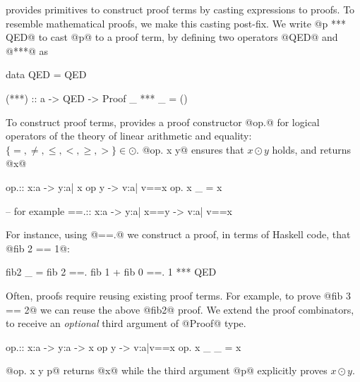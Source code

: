 \libname provides primitives to construct proof terms
by casting expressions to proofs.
%
To resemble mathematical proofs,
we make this casting post-fix.
%
We write @p *** QED@ to cast @p@ to a proof term,
by defining two operators @QED@ and @***@ as
%
\begin{code}
  data QED = QED

  (***) :: a -> QED -> Proof
  _ *** _  = ()
\end{code}

%
To construct proof terms, \libname
provides a proof constructor @op.@
for logical operators of the theory of
linear arithmetic and equality:
$\{=, \not =, \leq, <, \geq, > \} \in \odot$.
@op. x y@ ensures that $x \odot y$ holds, and returns @x@
%
\begin{code}
  op.:: x:a -> y:{a| x op y} -> {v:a| v==x}
  op. x _ = x

  -- for example
  ==.:: x:a -> y:{a| x==y} -> {v:a| v==x}
\end{code}
%
For instance, using @==.@
we construct a proof, in terms of Haskell code,
that @fib 2 == 1@:
%
\begin{code}
  fib2 _
    =   fib 2
    ==. fib 1 + fib 0
    ==. 1
    *** QED
\end{code} %

%
Often, proofs require reusing existing proof terms.
%
For example, to prove @fib 3 == 2@ we can reuse the above
@fib2@ proof.
%
We extend the proof combinators, to receive
an \textit{optional} third argument of @Proof@ type.
%
\begin{code}
  op.:: x:a -> y:a -> {x op y} -> {v:a|v==x}
  op. x _ _ = x
\end{code}
%
@op. x y p@ returns @x@ while the third argument @p@
explicitly proves $x \odot y$.

